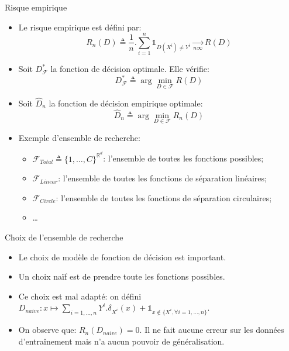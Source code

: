 \documentclass[8pt]{beamer}
\begin{document}
			\begin{frame}{Risque empirique}
				\begin{itemize}
					\item<1-> Le risque empirique est défini par:
						\begin{equation}
							R_n(D) \triangleq \frac{1}{n} . \sum_{i=1}^n \mathbb{1}_{D(X^i) \neq Y^i} \underset{n\infty}{\longrightarrow} R(D)
						\end{equation}
					\item<2-> Soit \(D^*_\mathscr{F}\) la fonction de décision optimale. Elle vérifie:
						\begin{equation}
							D^*_\mathscr{F} \triangleq \arg\min_{D \in \mathscr{F}} R(D)
						\end{equation}
					\item<3-> Soit \(\widehat D_n \) la fonction de décision empirique optimale:
						\begin{equation}
							\widehat D_n \triangleq \arg\min_{D \in \mathscr{F}} R_n(D)
						\end{equation}
					\item<3-> Exemple d'ensemble de recherche: 
					\begin{itemize}
						\item<4-> \(\mathscr{F}_{Total} \triangleq \{1, \dots, C\}^{\mathbb{R}^d}\): l'ensemble de toutes les fonctions possibles;
						\item<5-> \(\mathscr{F}_{Linear}\): l'ensemble de toutes les fonctions de séparation linéaires;
						\item<5-> \(\mathscr{F}_{Circle}\): l'ensemble de toutes les fonctions de séparation circulaires;
						\item<6-> \dots
					\end{itemize}
				\end{itemize}
			\end{frame}
			\begin{frame}{Choix de l'ensemble de recherche}
				\begin{itemize}
					\item<1-> Le choix de modèle de fonction de décision est important.
					\item<2-> Un choix naïf est de prendre toute les fonctions possibles. 
					\item<3-> Ce choix est mal adapté: on défini \(D_{naive}: x \mapsto \sum_{i=1,\dots,n} Y^i . \delta_{X^i}(x) + \mathbb{1}_{x \notin \{X^i, \forall i=1,\dots,n\}}\).
					\item<4-> On observe que: \(R_n(D_{naive}) = 0\). Il ne fait aucune erreur sur les données d'entraînement mais n'a aucun pouvoir de généralisation.
				\end{itemize}
			\end{frame}
\end{document}
